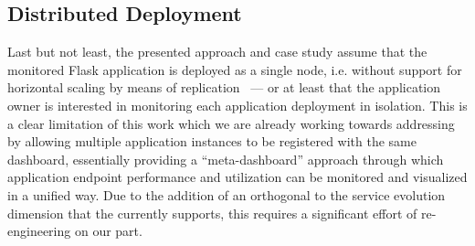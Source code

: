   \subsection*{Distributed Deployment}

	Last but not least, the presented approach and case study assume that the monitored Flask application is deployed as a single node, i.e. without support for horizontal scaling by means of replication~\cite{vaquero2011dynamically}  --- or at least that the application owner is interested in monitoring each application deployment in isolation. This is a clear limitation of this work which we are already working towards addressing by allowing multiple application instances to be registered with the same dashboard, essentially providing a ``meta-dashboard'' approach through which application endpoint performance and utilization can be monitored and visualized in a unified way. Due to the addition of an orthogonal to the service evolution dimension that the \tool currently supports, this requires a significant effort of re-engineering on our part.   
	
	

%
%
%










